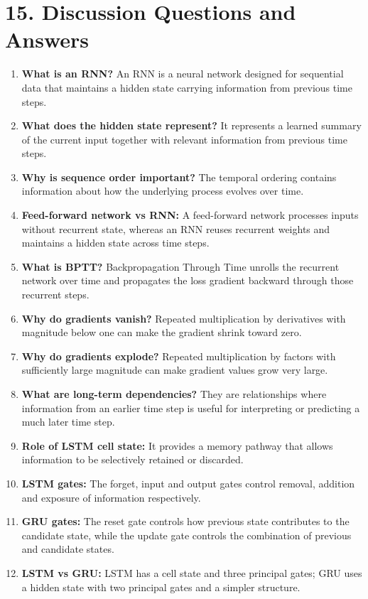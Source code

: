 \documentclass[10pt]{article}
\begin{document}
\section*{15. Discussion Questions and Answers}
\begin{enumerate}
\item \textbf{What is an RNN?} An RNN is a neural network designed for sequential data that maintains a hidden state carrying information from previous time steps.
\item \textbf{What does the hidden state represent?} It represents a learned summary of the current input together with relevant information from previous time steps.
\item \textbf{Why is sequence order important?} The temporal ordering contains information about how the underlying process evolves over time.
\item \textbf{Feed-forward network vs RNN:} A feed-forward network processes inputs without recurrent state, whereas an RNN reuses recurrent weights and maintains a hidden state across time steps.
\item \textbf{What is BPTT?} Backpropagation Through Time unrolls the recurrent network over time and propagates the loss gradient backward through those recurrent steps.
\item \textbf{Why do gradients vanish?} Repeated multiplication by derivatives with magnitude below one can make the gradient shrink toward zero.
\item \textbf{Why do gradients explode?} Repeated multiplication by factors with sufficiently large magnitude can make gradient values grow very large.
\item \textbf{What are long-term dependencies?} They are relationships where information from an earlier time step is useful for interpreting or predicting a much later time step.
\item \textbf{Role of LSTM cell state:} It provides a memory pathway that allows information to be selectively retained or discarded.
\item \textbf{LSTM gates:} The forget, input and output gates control removal, addition and exposure of information respectively.
\item \textbf{GRU gates:} The reset gate controls how previous state contributes to the candidate state, while the update gate controls the combination of previous and candidate states.
\item \textbf{LSTM vs GRU:} LSTM has a cell state and three principal gates; GRU uses a hidden state with two principal gates and a simpler structure.

\end{enumerate}
\end{document}
